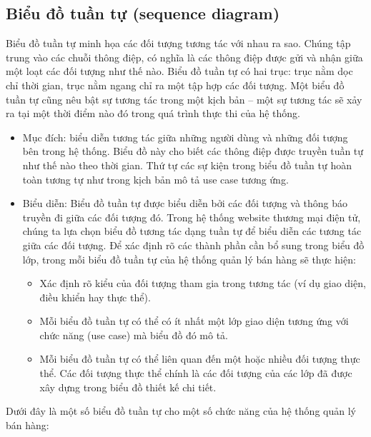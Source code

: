 \subsection{Biểu đồ tuần tự (sequence diagram)}
Biểu đồ tuần tự minh họa các đối tượng tương tác với nhau ra sao. Chúng tập trung vào các chuỗi thông điệp, có nghĩa là các thông điệp được gửi và nhận giữa một loạt các đối tượng như thế nào. Biểu đồ tuần tự có hai trục: trục nằm dọc chỉ thời gian, trục nằm ngang chỉ ra một tập hợp các đối tượng. Một biểu đồ tuần tự cũng nêu bật sự tương tác trong một kịch bản – một sự tương tác sẽ xảy ra tại một thời điểm nào đó trong quá trình thực thi của hệ thống.
\begin{itemize}
\item Mục đích: biểu diễn tương tác giữa những người dùng và những đối tượng bên trong hệ thống. Biểu đồ này cho biết các thông điệp được truyền tuần tự như thế nào theo thời gian. Thứ tự các sự kiện trong biểu đồ tuần tự hoàn toàn tương tự như trong kịch bản mô tả use case tương ứng.
\item Biểu diễn: Biểu đồ tuần tự được biểu diễn bởi các đối tượng và thông báo truyền đi giữa các đối tượng đó. Trong hệ thống website thương mại điện tử, chúng ta lựa chọn biểu đồ tương tác dạng tuần tự để biểu diễn các tương tác giữa các đối tượng. Để xác định rõ các thành phần cần bổ sung trong biểu đồ lớp, trong mỗi biểu đồ tuần tự của hệ thống quản lý bán hàng sẽ thực hiện:
\begin{itemize}
\item Xác định rõ kiểu của đối tượng tham gia trong tương tác (ví dụ giao diện, điều khiển hay thực thể).
\item Mỗi biểu đồ tuần tự có thể có ít nhất một lớp giao diện tương ứng với chức năng (use case) mà biểu đồ đó mô tả.
\item Mỗi biểu đồ tuần tự có thể liên quan đến một hoặc nhiều đối tượng thực thể. Các đối tượng thực thể chính là các  đối tượng của các lớp  đã được xây dựng trong biểu đồ thiết kế chi tiết.
\end{itemize}
\end{itemize}
\par
Dưới đây là một số biểu đồ tuần tự cho một số chức năng của hệ thống quản lý bán hàng:
